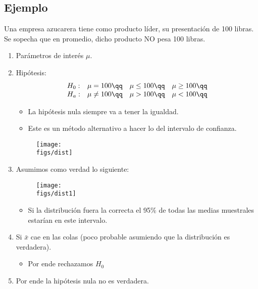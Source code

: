 \subsection{Ejemplo}
Una empresa azucarera tiene como producto líder, su presentación de 100 libras. Se sopecha que en promedio, dicho producto NO pesa 100 libras. 
\begin{enumerate}
    \item Parámetros de interés $\mu $.
    \item Hipótesis:
        \[
            \begin{array}{lrcc}
                H_0: & \mu = 100\qq    & \mu \leq 100 \qq & \mu \geq 100\qq \\
                H_a: & \mu \neq 100 \qq & \mu > 100 \qq & \mu < 100 \qq \\
            \end{array}
        \]
        \begin{itemize}
            \item La hipótesis nula siempre va a tener la igualdad.
            \item Este es un método alternativo a hacer lo del intervalo de confianza.
        \end{itemize}
        \begin{figure}[H]
            \centering
            \texttt{[image: \\figs/dist]} 
        \end{figure}
    
    \item Asumimos como verdad lo siguiente:
        \begin{figure}[H]
            \centering
            \texttt{[image: \\figs/dist1]} 
        \end{figure}
        \begin{itemize}
            \item Si la distribución fuera la correcta el 95\% de todas las medias muestrales estarían en este intervalo.
        \end{itemize}
    
    \item Si $\bar{x}$ cae en las colas (poco probable asumiendo que la distribución es verdadera).
        \begin{itemize}
            \item Por ende rechazamos $H_0$ 
        \end{itemize}
    
    \item Por ende la hipótesis nula no es verdadera.
\end{enumerate}



 
